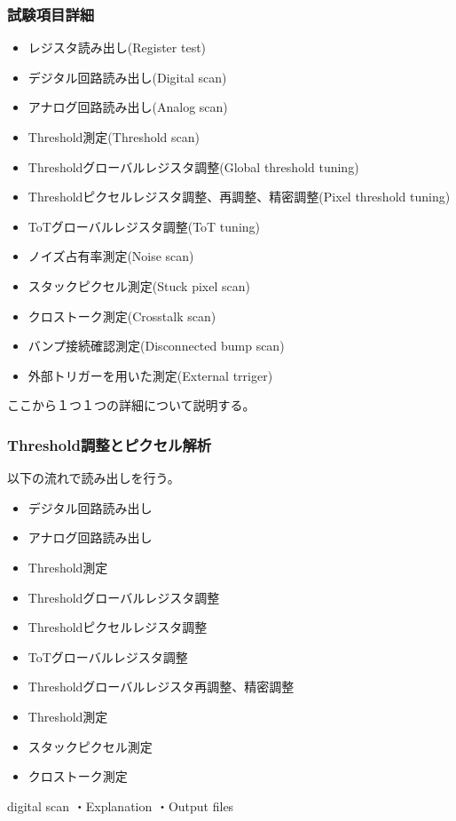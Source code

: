 \subsubsection{試験項目詳細}
\begin{itemize}
  \item レジスタ読み出し(Register test)
  \item デジタル回路読み出し(Digital scan)
  \item アナログ回路読み出し(Analog scan)
  \item Threshold測定(Threshold scan)
  \item Thresholdグローバルレジスタ調整(Global threshold tuning)
  \item Thresholdピクセルレジスタ調整、再調整、精密調整(Pixel threshold tuning)
  \item ToTグローバルレジスタ調整(ToT tuning)
  \item ノイズ占有率測定(Noise scan)
  \item スタックピクセル測定(Stuck pixel scan)
  \item クロストーク測定(Crosstalk scan)
  \item バンプ接続確認測定(Disconnected bump scan)
  \item 外部トリガーを用いた測定(External trriger)
\end{itemize}
ここから１つ１つの詳細について説明する。
  
\subsubsection{Threshold調整とピクセル解析}\label{sec:pixel_analysis}
以下の流れで読み出しを行う。
\begin{itemize}
  \item デジタル回路読み出し
  \item アナログ回路読み出し
  \item Threshold測定
  \item Thresholdグローバルレジスタ調整
  \item Thresholdピクセルレジスタ調整
  \item ToTグローバルレジスタ調整
  \item Thresholdグローバルレジスタ再調整、精密調整
  \item Threshold測定
  \item スタックピクセル測定
  \item クロストーク測定
\end{itemize}

digital scan
・Explanation
・Output files


